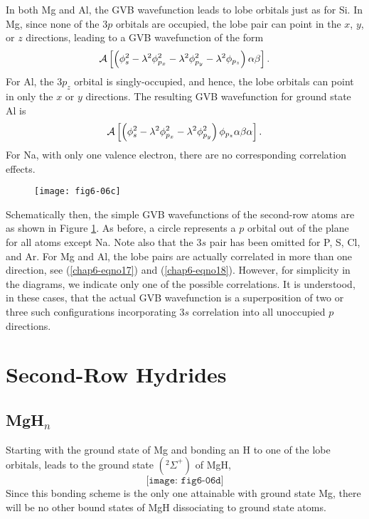 In both Mg and Al, the GVB wavefunction leads to 
lobe orbitals just as for Si.  In Mg, since none of the $3p$ orbitals 
are occupied, the lobe pair can point in the $x$, $y$, or $z$ 
directions, leading to a GVB wavefunction of the 
form
\begin{equation}
{\cal A} \left[ \left( \phi^2_s - \lambda^2 \phi^2_{p_x} - \lambda^2 
\phi^2_{p_y} - \lambda^2 \phi_{p_z} \right) \alpha \beta \right].
\label{chap6-eqno17}
\end{equation}
For Al, the $3p_z$  orbital is singly-occupied, and hence, the lobe 
orbitals can point in only the $x$ or $y$ directions.  The resulting 
GVB wavefunction for ground state Al is
\begin{equation}
{\cal A} \left[ \left( \phi^2_s - \lambda^2 \phi^2_{p_x} - \lambda^2 
\phi^2_{p_y} \right) \phi_{p_z} \alpha \beta \alpha \right] .
\label{chap6-eqno18}
\end{equation}
For Na, with only one valence electron, there are no corresponding 
correlation effects.

\begin{figure}
\texttt{[image: fig6-06c]}
\caption{}
\label{chap6-fig6-2}
\end{figure}

Schematically then, the simple GVB wavefunctions
of the second-row atoms are as shown in Figure \ref{chap6-fig6-2}.  As
before, a circle represents a $p$ orbital out of the plane for all
atoms except Na.  Note also that the $3s$ pair has been omitted for P,
S, Cl, and Ar.  For Mg and Al, the lobe pairs are actually correlated
in more than one direction, see (\ref{chap6-eqno17}) and
(\ref{chap6-eqno18}).  However, for simplicity in the diagrams, we
indicate only one of the possible correlations.  It is understood, in
these cases, that the actual GVB wavefunction is
a superposition of two or three such configurations incorporating $3s$
correlation into all unoccupied $p$ directions.

\section{Second-Row Hydrides}

\subsection{MgH$_n$}

Starting with the ground state of Mg and bonding an H to one of the
lobe orbitals, leads to the ground state $({^2\Sigma}^+)$ of MgH,
\begin{equation}
\texttt{[image: fig6-06d]}
\label{chap6-eqno20}
\end{equation}
Since this bonding scheme is the only one attainable with ground 
state Mg, there will be no other bound states of MgH dissociating to 
ground state atoms.


